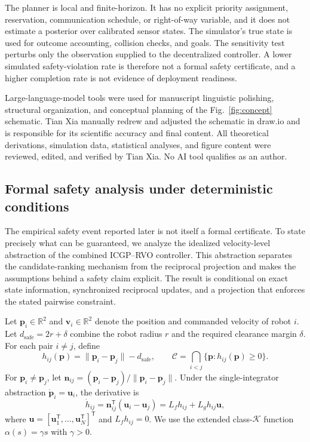 \documentclass[pdflatex,sn-mathphys-num]{sn-jnl}
\begin{document}
The planner is local and finite-horizon. It has no explicit priority assignment, reservation, communication schedule, or right-of-way variable, and it does not estimate a posterior over calibrated sensor states. The simulator's true state is used for outcome accounting, collision checks, and goals. The sensitivity test perturbs only the observation supplied to the decentralized controller. A lower simulated safety-violation rate is therefore not a formal safety certificate, and a higher completion rate is not evidence of deployment readiness.

Large-language-model tools were used for manuscript linguistic polishing, structural organization, and conceptual planning of the Fig.~\ref{fig:concept} schematic. Tian Xia manually redrew and adjusted the schematic in draw.io and is responsible for its scientific accuracy and final content. All theoretical derivations, simulation data, statistical analyses, and figure content were reviewed, edited, and verified by Tian Xia. No AI tool qualifies as an author.

\subsection{Formal safety analysis under deterministic conditions}
\label{sec:formal-safety}

The empirical safety event reported later is not itself a formal certificate. To state precisely what can be guaranteed, we analyze the idealized velocity-level abstraction of the combined ICGP--RVO controller. This abstraction separates the candidate-ranking mechanism from the reciprocal projection and makes the assumptions behind a safety claim explicit. The result is conditional on exact state information, synchronized reciprocal updates, and a projection that enforces the stated pairwise constraint.

Let $\mathbf{p}_i\in\mathbb{R}^{2}$ and $\mathbf{v}_i\in\mathbb{R}^{2}$ denote the position and commanded velocity of robot $i$. Let $d_{\mathrm{safe}}=2r+\delta$ combine the robot radius $r$ and the required clearance margin $\delta$. For each pair $i\neq j$, define
\begin{equation}
h_{ij}(\mathbf{p})=\lVert \mathbf{p}_i-\mathbf{p}_j\rVert-d_{\mathrm{safe}},\qquad
\mathcal{C}=\bigcap_{i<j}\{\mathbf{p}:h_{ij}(\mathbf{p})\geq 0\}.
\label{eq:cbf-set}
\end{equation}
For $\mathbf{p}_i\neq\mathbf{p}_j$, let $\mathbf{n}_{ij}=(\mathbf{p}_i-\mathbf{p}_j)/\lVert\mathbf{p}_i-\mathbf{p}_j\rVert$. Under the single-integrator abstraction $\dot{\mathbf{p}}_i=\mathbf{u}_i$, the derivative is
\begin{equation}
\dot h_{ij}=\mathbf{n}_{ij}^{\mathsf T}(\mathbf{u}_i-\mathbf{u}_j)=L_fh_{ij}+L_gh_{ij}\mathbf{u},
\label{eq:cbf-derivative}
\end{equation}
where $\mathbf{u}=[\mathbf{u}_1^{\mathsf T},\ldots,\mathbf{u}_N^{\mathsf T}]^{\mathsf T}$ and $L_fh_{ij}=0$. We use the extended class-$\mathcal{K}$ function $\alpha(s)=\gamma s$ with $\gamma>0$.
\end{document}
